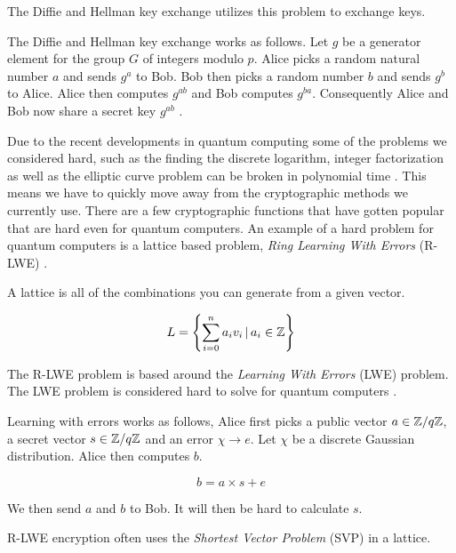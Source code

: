 The Diffie and Hellman key exchange utilizes this problem to exchange keys.

\begin{definition}

    The Diffie and Hellman key exchange works as follows. Let $g$ be a generator
    element for the group $G$ of integers modulo $p$. Alice picks a random
    natural number $a$ and sends $g^a$ to Bob. Bob then picks a random number
    $b$ and sends $g^b$ to Alice. Alice then computes $g^{ab}$ and Bob computes
    $g^{ba}$. Consequently Alice and Bob now share a secret key $g^{ab}$
    \citep{FranciscoRodriguez-Henriquez10}.

\end{definition}

Due to the recent developments in quantum computing some of the problems we
considered hard, such as the finding the discrete logarithm, integer
factorization as well as the elliptic curve problem can be broken in polynomial
time \citep{ShorQuantum}. This means we have to quickly move away from the
cryptographic methods we currently use. There are a few cryptographic functions
that have gotten popular that are hard even for quantum computers. An example
of a hard problem for quantum computers is a lattice based problem,
\textit{Ring Learning With Errors} (R-LWE)
\citep{FPGA_Post_Quantum_Primitives}.

\begin{definition}
    A lattice is all of the combinations you can generate from a given vector.

    \[L = \left\{ \sum_{i = 0}^n a_iv_i \, | \, a_i \in \mathbb{Z} \right\}\]
\end{definition}

The R-LWE problem is based around the \textit{Learning With Errors} (LWE)
problem. The LWE problem is considered hard to solve for quantum computers
\citep{Regev05}.

\begin{definition}
    Learning with errors works as follows, Alice first picks a public vector
    $a \in \mathbb{Z} / q\mathbb{Z}$, a secret vector $s \in \mathbb{Z} / q\mathbb{Z}$ and an error $\chi
    \rightarrow e$. Let $\chi$ be a discrete Gaussian distribution.  Alice then
    computes $b$.

    \[ b = a \times s + e \]

    We then send $a$ and $b$ to Bob. It will then be hard to calculate $s$.
\end{definition}

R-LWE encryption often uses the \textit{Shortest Vector Problem} (SVP) in a
lattice.

